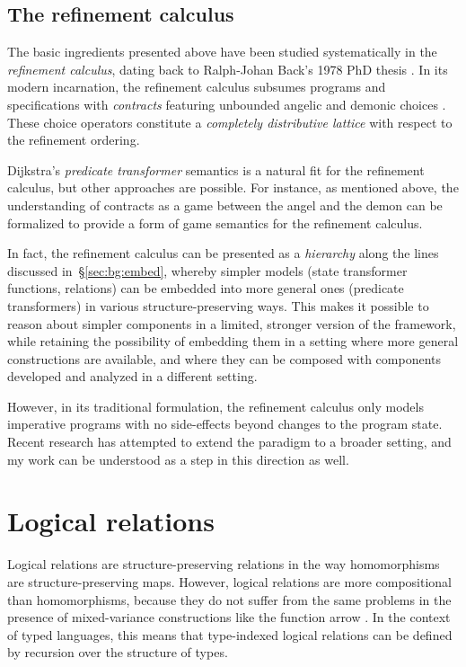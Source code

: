 \documentclass[11pt,oneside,draft]{book}
\theoremstyle{definition}
\begin{document}

\subsection{The refinement calculus} %

The basic ingredients presented above have been studied systematically
in the \emph{refinement calculus},
dating back to Ralph-Johan Back's 1978 PhD thesis \citep{backthesis}.
In its modern incarnation,
the refinement calculus
subsumes programs and specifications with \emph{contracts}
featuring unbounded angelic and demonic choices \citep{refcal}.
These choice operators
constitute a \emph{completely distributive lattice}
with respect to the refinement ordering.

Dijkstra's \emph{predicate transformer} semantics \citep{gc}
is a natural fit for the refinement calculus,
but other approaches are possible.
For instance,
as mentioned above,
the understanding of contracts as a game between
the angel and the demon
can be formalized to provide a form of
game semantics for the refinement calculus.

In fact,
the refinement calculus can be presented as a \emph{hierarchy}
along the lines discussed in~\S\ref{sec:bg:embed},
whereby simpler models (state transformer functions, relations)
can be embedded into more general ones (predicate transformers)
in various structure-preserving ways.
This makes it possible to reason about simpler components
in a limited, stronger version of the framework,
while retaining the possibility of embedding them
in a setting
where more general constructions are available,
and where they can be composed with components
developed and analyzed in a different setting.

However,
in its traditional formulation,
the refinement calculus only models imperative programs
with no side-effects beyond changes to the program state.
Recent research has attempted to extend the paradigm
to a broader setting,
and my work can be understood
as a step in this direction as well.



\section{Logical relations} \label{sec:lr} %

Logical relations are structure-preserving relations
in the way homomorphisms are structure-preserving maps.
However,
logical relations are more compositional than homomorphisms,
because they do not suffer from the same problems
in the presence of mixed-variance constructions
like the function arrow %
\citep{lrp}.
In the context of typed languages,
this means that type-indexed logical relations
can be defined by recursion over the structure of types.
\end{document}
